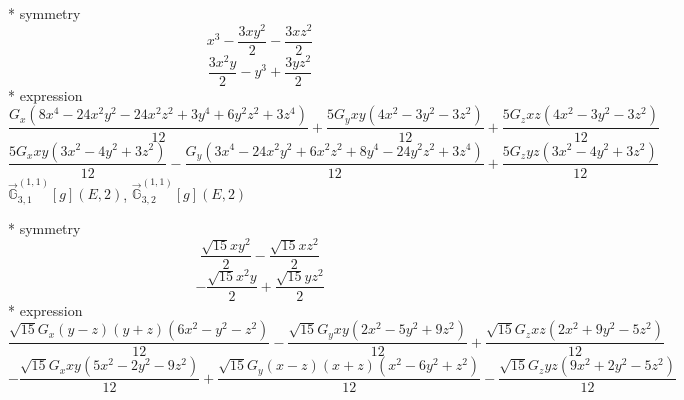 \documentclass[fleqn,8pt]{jsarticle}
\begin{document}
\noindent\quad ** symmetry
\begin{dmath*}
x^{3} - \frac{3 x y^{2}}{2} - \frac{3 x z^{2}}{2}
\end{dmath*}
\begin{dmath*}
\frac{3 x^{2} y}{2} - y^{3} + \frac{3 y z^{2}}{2}
\end{dmath*}
\noindent\quad ** expression
\begin{dmath*}
\frac{G_{x} \left(8 x^{4} - 24 x^{2} y^{2} - 24 x^{2} z^{2} + 3 y^{4} + 6 y^{2} z^{2} + 3 z^{4}\right)}{12} + \frac{5 G_{y} x y \left(4 x^{2} - 3 y^{2} - 3 z^{2}\right)}{12} + \frac{5 G_{z} x z \left(4 x^{2} - 3 y^{2} - 3 z^{2}\right)}{12}
\end{dmath*}
\begin{dmath*}
\frac{5 G_{x} x y \left(3 x^{2} - 4 y^{2} + 3 z^{2}\right)}{12} - \frac{G_{y} \left(3 x^{4} - 24 x^{2} y^{2} + 6 x^{2} z^{2} + 8 y^{4} - 24 y^{2} z^{2} + 3 z^{4}\right)}{12} + \frac{5 G_{z} y z \left(3 x^{2} - 4 y^{2} + 3 z^{2}\right)}{12}
\end{dmath*}
\noindent\quad $\vec{\mathbb{G}}_{3,1}^{(1,1)}[g](E,2)$, $\vec{\mathbb{G}}_{3,2}^{(1,1)}[g](E,2)$

\noindent\quad ** symmetry
\begin{dmath*}
\frac{\sqrt{15} x y^{2}}{2} - \frac{\sqrt{15} x z^{2}}{2}
\end{dmath*}
\begin{dmath*}
- \frac{\sqrt{15} x^{2} y}{2} + \frac{\sqrt{15} y z^{2}}{2}
\end{dmath*}
\noindent\quad ** expression
\begin{dmath*}
\frac{\sqrt{15} G_{x} \left(y - z\right) \left(y + z\right) \left(6 x^{2} - y^{2} - z^{2}\right)}{12} - \frac{\sqrt{15} G_{y} x y \left(2 x^{2} - 5 y^{2} + 9 z^{2}\right)}{12} + \frac{\sqrt{15} G_{z} x z \left(2 x^{2} + 9 y^{2} - 5 z^{2}\right)}{12}
\end{dmath*}
\begin{dmath*}
- \frac{\sqrt{15} G_{x} x y \left(5 x^{2} - 2 y^{2} - 9 z^{2}\right)}{12} + \frac{\sqrt{15} G_{y} \left(x - z\right) \left(x + z\right) \left(x^{2} - 6 y^{2} + z^{2}\right)}{12} - \frac{\sqrt{15} G_{z} y z \left(9 x^{2} + 2 y^{2} - 5 z^{2}\right)}{12}
\end{dmath*}
\end{document}
